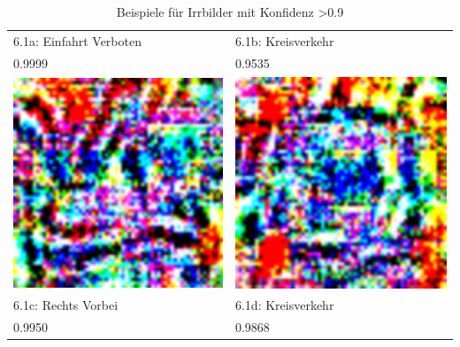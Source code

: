 \begin{table}
\begin{tabular}{p{4.4cm}p{4.4cm}}
	6.1a: Einfahrt Verboten & 6.1b: Kreisverkehr \\
	0.9999&0.9535\\
	\includegraphics[width=\linewidth]{Images/AnPe/39_RechtsVorbeiOrigLinksvorbei} &\includegraphics[width=\linewidth]{Images/AnPe/40_kreisverkehr}  \\
	6.1c: Rechts Vorbei&6.1d: Kreisverkehr\\
	0.9950&0.9868\\
\end{tabular}

\caption{Beispiele für Irrbilder mit Konfidenz >0.9}
\label{tab:gasc1}
\end{table}

